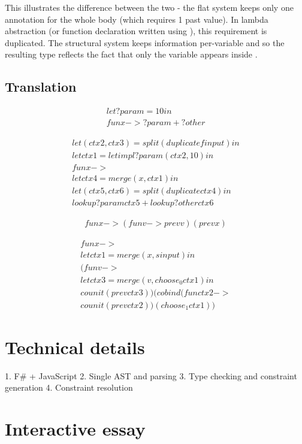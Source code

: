 This illustrates the difference between the two - the flat system keeps only one annotation
for the whole body (which requires 1 past value). In lambda abstraction (or function declaration
written using ), this requirement is duplicated. The structural system keeps information
per-variable and so the resulting type reflects the fact that only the variable  appears
inside .


\subsection{Translation}
\label{sec:impl-case-transl}



\begin{equation*}
\begin{array}{l}
let ?param = 10 in\\[-0.25em]
fun x -> ?param + ?other
\end{array}
\end{equation*}

\begin{equation*}
\begin{array}{l}
let (ctx2, ctx3) = split (duplicate finput) in\\[-0.25em]
let ctx1 = letimpl ?param (ctx2, 10) in\\[-0.25em]
fun x ->\\[-0.25em]
  let ctx4 = merge (x, ctx1) in\\[-0.25em]
  let (ctx5, ctx6) = split (duplicate ctx4) in\\[-0.25em]
  lookup ?param ctx5 + lookup ?other ctx6
\end{array}
\end{equation*}


\begin{equation*}
\begin{array}{l}
fun x -> (fun v -> prev v) (prev x)
\end{array}
\end{equation*}

\begin{equation*}
\begin{array}{l}
fun x ->\\[-0.25em]
  let ctx1 = merge (x, sinput) in\\[-0.25em]
  (fun v ->\\[-0.25em]
    let ctx3 = merge (v, choose_0 ctx1) in\\[-0.25em]
    counit (prev ctx3)) (cobind (fun ctx2 ->\\[-0.25em]
      counit (prev ctx2)) (choose_1 ctx1))
\end{array}
\end{equation*}

\section{Technical details}
\label{sec:impl-tech}

1. F# + JavaScript
2. Single AST and parsing
3. Type checking and constraint generation
4. Constraint resolution

\section{Interactive essay}
\label{sec:impl-essay}
